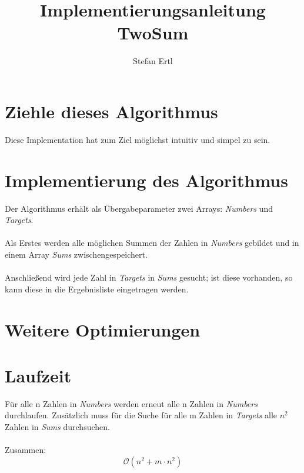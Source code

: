 \documentclass[a4paper, 11pt]{article}
\title{Implementierungsanleitung TwoSum}
\author{Stefan Ertl}
\date{}
\begin{document}
    \maketitle

    \section{Ziehle dieses Algorithmus}
    Diese Implementation hat zum Ziel möglichst intuitiv und simpel zu sein.


    \section{Implementierung des Algorithmus}
    Der Algorithmus erhält als Übergabeparameter zwei Arrays: \textit{Numbers} und \textit{Targets}.\\\\
    Als Erstes werden alle möglichen Summen der Zahlen in \textit{Numbers} gebildet und in einem Array \textit{Sums} zwischengespeichert.\\\\
    Anschließend wird jede Zahl in \textit{Targets} in \textit{Sums} gesucht; ist diese vorhanden, so kann diese in die Ergebnisliste eingetragen werden.

    \section{Weitere Optimierungen}



    \section{Laufzeit}
    Für alle n Zahlen in \textit{Numbers} werden erneut alle n Zahlen in \textit{Numbers} durchlaufen. Zusätzlich muss für die Suche für alle m Zahlen in \textit{Targets} alle \(n^2\) Zahlen in \textit{Sums} durchsuchen.\\\\
    Zusammen: \[
                  \mathcal{O}\left(n^2 + m \cdot n^2\right)
    \]

\end{document}
